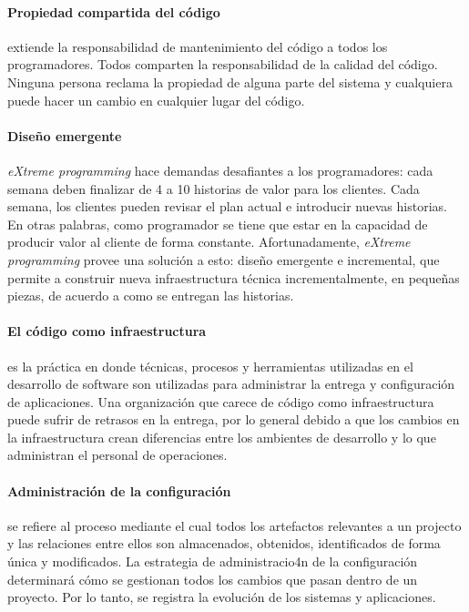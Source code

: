 \paragraph{Propiedad compartida del código} extiende la responsabilidad de mantenimiento del código a todos los programadores. Todos comparten la responsabilidad de la calidad del código. Ninguna persona reclama la propiedad de alguna parte del sistema y cualquiera puede hacer un cambio en cualquier lugar del código\cite{shore-warden}.

\paragraph{Diseño emergente} \emph{eXtreme programming} hace demandas desafiantes a los programadores: cada semana deben finalizar de 4 a 10 historias de valor para los clientes. Cada semana, los clientes pueden revisar el plan actual e introducir nuevas historias. En otras palabras, como programador se tiene que estar en la capacidad de producir valor al cliente de forma constante. Afortunadamente, \emph{eXtreme programming} provee una solución a esto: diseño emergente e incremental, que permite a construir nueva infraestructura técnica incrementalmente, en pequeñas piezas, de acuerdo a como se entregan las historias\cite{shore-warden}.

\paragraph{El código como infraestructura} es la práctica en donde técnicas, procesos y herramientas utilizadas en el desarrollo de software son utilizadas para administrar la entrega y configuración de aplicaciones. Una organización que carece de código como infraestructura puede sufrir de retrasos en la entrega, por lo general debido a que los cambios en la infraestructura crean diferencias entre los ambientes de desarrollo y lo que administran el personal de operaciones\cite{humble}.

\paragraph{Administración de la configuración} se refiere al proceso mediante el cual todos los artefactos relevantes a un projecto y las relaciones entre ellos son almacenados, obtenidos, identificados de forma única y modificados. La estrategia de administracio4n de la configuración determinará cómo se gestionan todos los cambios que pasan dentro de un proyecto. Por lo tanto, se registra la evolución de los sistemas y aplicaciones\cite{humble}.

